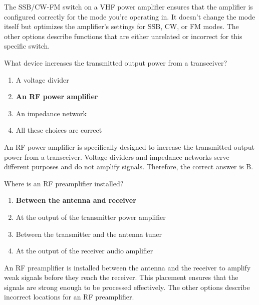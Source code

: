 The SSB/CW-FM switch on a VHF power amplifier ensures that the amplifier is configured correctly for the mode you're operating in. It doesn't change the mode itself but optimizes the amplifier's settings for SSB, CW, or FM modes. The other options describe functions that are either unrelated or incorrect for this specific switch.

\begin{tcolorbox}[colback=gray!10!white,colframe=black!75!black,title={T7A10}]
    What device increases the transmitted output power from a transceiver?
    \begin{enumerate}[label=\Alph*),noitemsep]
        \item A voltage divider
        \item \textbf{An RF power amplifier}
        \item An impedance network
        \item All these choices are correct
    \end{enumerate}
\end{tcolorbox}

An RF power amplifier is specifically designed to increase the transmitted output power from a transceiver. Voltage dividers and impedance networks serve different purposes and do not amplify signals. Therefore, the correct answer is B.

\begin{tcolorbox}[colback=gray!10!white,colframe=black!75!black,title={T7A11}]
    Where is an RF preamplifier installed?
    \begin{enumerate}[label=\Alph*),noitemsep]
        \item \textbf{Between the antenna and receiver}
        \item At the output of the transmitter power amplifier
        \item Between the transmitter and the antenna tuner
        \item At the output of the receiver audio amplifier
    \end{enumerate}
\end{tcolorbox}

An RF preamplifier is installed between the antenna and the receiver to amplify weak signals before they reach the receiver. This placement ensures that the signals are strong enough to be processed effectively. The other options describe incorrect locations for an RF preamplifier.
